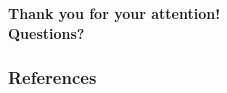 \documentclass{beamer} %
\begin{document}
\begin{frame}
\justifying
\center
\textbf{Thank you for your attention!\\ Questions?}
\end{frame}

\begin{frame}[allowframebreaks]
        \frametitle{References}
        
        
\end{frame}
\end{document}
